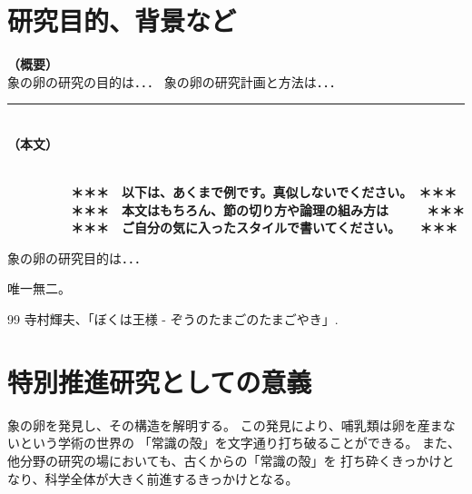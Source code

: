 \documentclass[11pt,a4j,dvipdfmx]{jarticle} 					%
\newcommand{\研究課題名}{象の卵}
\newcommand{\研究機関名}{逢坂大学}
\newcommand{\研究代表者氏名}{湯川秀樹}
\newcommand{\研究期間の最終元号年度}{7}  %
\begin{document}

\section{研究目的、背景など}

\noindent
\mbox{\textbf{（概要）}}\\
	象の卵の研究の目的は．．．	
	象の卵の研究計画と方法は．．．

\noindent
\rule{\linewidth}{1pt}\\
\noindent
\mbox{\textbf{（本文）}}
\JSPSInstructions	%

\textbf{\\　　　　　＊＊＊　以下は、あくまで例です。真似しないでください。　＊＊＊\\
　　　　　＊＊＊　本文はもちろん、節の切り方や論理の組み方は　　　＊＊＊\\
　　　　　＊＊＊　ご自分の気に入ったスタイルで書いてください。　　＊＊＊}

	 象の卵の研究目的は．．．

	唯一無二。




	\vspace{1cm}
	\begin{thebibliography}{99}
		 寺村輝夫、「ぼくは王様 - ぞうのたまごのたまごやき」.
	\end{thebibliography}




\section{特別推進研究としての意義}

	象の卵を発見し、その構造を解明する。
	この発見により、哺乳類は卵を産まないという学術の世界の
	「常識の殻」を文字通り打ち破ることができる。
	また、他分野の研究の場においても、古くからの「常識の殻」を
	打ち砕くきっかけとなり、科学全体が大きく前進するきっかけとなる。
\end{document}
